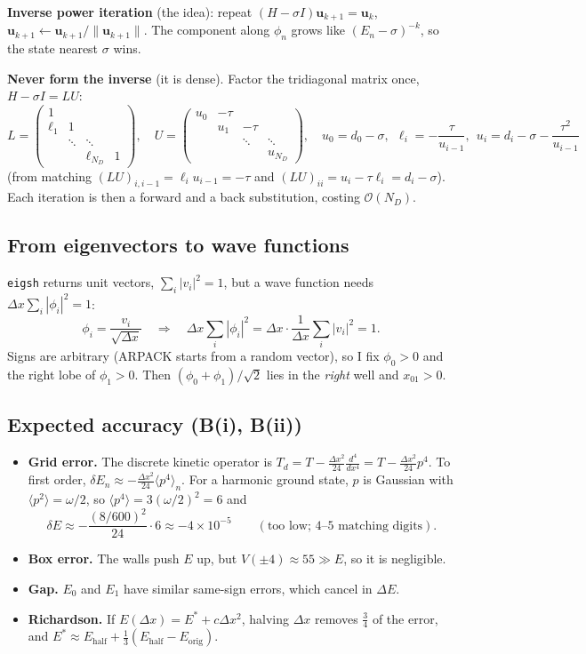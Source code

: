 \documentclass[10pt]{article}
\newcommand{\code}[1]{\texttt{#1}}
\begin{document}
\textbf{Inverse power iteration} (the idea): repeat $(H-\sigma I)\boldsymbol u_{k+1}=\boldsymbol u_k$, $\boldsymbol u_{k+1}\leftarrow\boldsymbol u_{k+1}/\|\boldsymbol u_{k+1}\|$. The component along $\phi_n$ grows like $(E_n-\sigma)^{-k}$, so the state nearest $\sigma$ wins.

\textbf{Never form the inverse} (it is dense). Factor the tridiagonal matrix once, $H-\sigma I=LU$:
\[
L=\begin{pmatrix}1&&&\\\ell_1&1&&\\&\ddots&\ddots&\\&&\ell_{N_D}&1\end{pmatrix},\quad
U=\begin{pmatrix}u_0&-\tau&&\\&u_1&-\tau&\\&&\ddots&\ddots\\&&&u_{N_D}\end{pmatrix},\quad
u_0=d_0-\sigma,\ \ \ell_i=-\frac{\tau}{u_{i-1}},\ \ u_i=d_i-\sigma-\frac{\tau^2}{u_{i-1}}
\]
(from matching $(LU)_{i,i-1}=\ell_iu_{i-1}=-\tau$ and $(LU)_{ii}=u_i-\tau\ell_i=d_i-\sigma$). Each iteration is then a forward and a back substitution, costing $\mathcal O(N_D)$.

\subsection{From eigenvectors to wave functions}
\code{eigsh} returns unit vectors, $\sum_i|v_i|^2=1$, but a wave function needs $\Delta x\sum_i|\phi_i|^2=1$:
\[
\phi_i=\frac{v_i}{\sqrt{\Delta x}}\quad\Rightarrow\quad\Delta x\sum_i|\phi_i|^2=\Delta x\cdot\frac1{\Delta x}\sum_i|v_i|^2=1 .
\]
Signs are arbitrary (ARPACK starts from a random vector), so I fix $\phi_0>0$ and the right lobe of $\phi_1>0$. Then $(\phi_0+\phi_1)/\sqrt2$ lies in the \emph{right} well and $x_{01}>0$.

\subsection{Expected accuracy (B(i), B(ii))}
\begin{itemize}
\item \textbf{Grid error.} The discrete kinetic operator is $T_d=T-\frac{\Delta x^2}{24}\frac{d^4}{dx^4}=T-\frac{\Delta x^2}{24}p^4$. To first order, $\delta E_n\approx-\frac{\Delta x^2}{24}\langle p^4\rangle_n$. For a harmonic ground state, $p$ is Gaussian with $\langle p^2\rangle=\omega/2$, so $\langle p^4\rangle=3(\omega/2)^2=6$ and
\[
\delta E\approx-\frac{(8/600)^2}{24}\cdot6\approx-4\times10^{-5}\qquad(\text{too low; 4--5 matching digits}).
\]
\item \textbf{Box error.} The walls push $E$ up, but $V(\pm4)\approx55\gg E$, so it is negligible.
\item \textbf{Gap.} $E_0$ and $E_1$ have similar same-sign errors, which cancel in $\Delta E$.
\item \textbf{Richardson.} If $E(\Delta x)=E^*+c\Delta x^2$, halving $\Delta x$ removes $\tfrac34$ of the error, and $E^*\approx E_\text{half}+\tfrac13(E_\text{half}-E_\text{orig})$.
\end{itemize}
\end{document}
